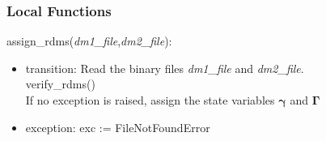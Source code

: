 \documentclass[12pt, titlepage]{article}
\begin{document}

%

\subsubsection{Local Functions}

\noindent assign\_rdms(\textit{dm1\_file},\textit{dm2\_file}):
\begin{itemize}
	\item transition: Read the binary files \textit{dm1\_file} and 
	\textit{dm2\_file}.\\
	verify\_rdms()\\
	If no exception is raised, assign the state variables $\boldsymbol{\gamma}$ 
	and $\boldsymbol{\Gamma}$	
	\item exception: exc := FileNotFoundError
\end{itemize}
\end{document}
